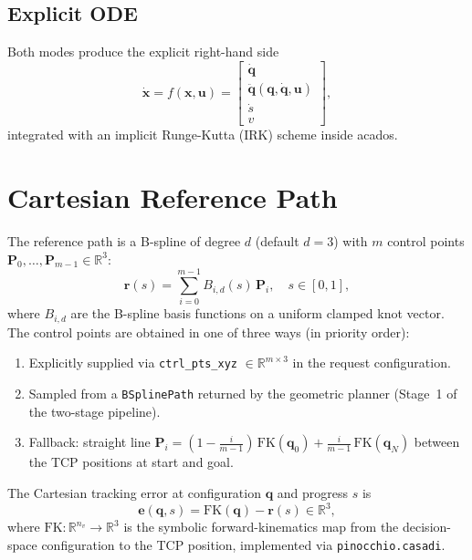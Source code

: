 \documentclass[11pt, a4paper]{article}
\newcommand{\R}{\mathbb{R}}
\newcommand{\qd}{\bm{q}}          %
\newcommand{\dqd}{\dot{\bm{q}}}   %
\newcommand{\ddqd}{\ddot{\bm{q}}} %
\newcommand{\FK}{\mathrm{FK}}
\begin{document}
\subsection{Explicit ODE}

Both modes produce the explicit right-hand side
\begin{equation}
  \dot{\bm{x}} = f(\bm{x}, \bm{u}) =
  \begin{bmatrix}
    \dqd \\ \ddqd(\qd, \dqd, \bm{u}) \\ \dot{s} \\ v
  \end{bmatrix},
\end{equation}
integrated with an implicit Runge-Kutta (IRK) scheme inside acados.

\section{Cartesian Reference Path}

The reference path is a B-spline of degree $d$ (default $d=3$) with $m$ control points
$\bm{P}_0,\dots,\bm{P}_{m-1} \in \R^3$:
\begin{equation}
  \bm{r}(s) = \sum_{i=0}^{m-1} B_{i,d}(s)\,\bm{P}_i, \quad s \in [0,1],
\end{equation}
where $B_{i,d}$ are the B-spline basis functions on a uniform clamped knot vector.
The control points are obtained in one of three ways (in priority order):
\begin{enumerate}
  \item Explicitly supplied via \texttt{ctrl\_pts\_xyz} $\in \R^{m \times 3}$ in the
        request configuration.
  \item Sampled from a \texttt{BSplinePath} returned by the geometric planner
        (Stage~1 of the two-stage pipeline).
  \item Fallback: straight line $\bm{P}_i = (1-\frac{i}{m-1})\,\FK(\qd_0) +
        \frac{i}{m-1}\,\FK(\qd_N)$ between the TCP positions at start and goal.
\end{enumerate}

The Cartesian tracking error at configuration $\qd$ and progress $s$ is
\begin{equation}
  \bm{e}(\qd, s) = \FK(\qd) - \bm{r}(s) \in \R^3,
\end{equation}
where $\FK : \R^{n_v} \to \R^3$ is the symbolic forward-kinematics map from the
decision-space configuration to the TCP position, implemented via
\texttt{pinocchio.casadi}.
\end{document}
